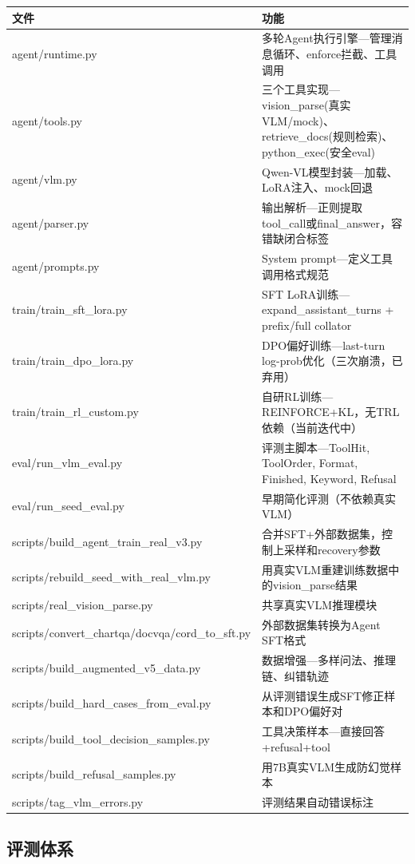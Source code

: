 \documentclass[fontset=none,11pt,a4paper]{ctexart}
\begin{document}
\begin{longtable}{lp{9cm}}
\toprule
文件 & 功能 \\
\midrule
agent/runtime.py & 多轮Agent执行引擎---管理消息循环、enforce拦截、工具调用 \\
agent/tools.py & 三个工具实现---vision\_parse(真实VLM/mock)、retrieve\_docs(规则检索)、python\_exec(安全eval) \\
agent/vlm.py & Qwen-VL模型封装---加载、LoRA注入、mock回退 \\
agent/parser.py & 输出解析---正则提取tool\_call或final\_answer，容错缺闭合标签 \\
agent/prompts.py & System prompt---定义工具调用格式规范 \\
\midrule
train/train\_sft\_lora.py & SFT LoRA训练---expand\_assistant\_turns + prefix/full collator \\
train/train\_dpo\_lora.py & DPO偏好训练---last-turn log-prob优化（三次崩溃，已弃用） \\
train/train\_rl\_custom.py & 自研RL训练---REINFORCE+KL，无TRL依赖（当前迭代中） \\
\midrule
eval/run\_vlm\_eval.py & 评测主脚本---ToolHit, ToolOrder, Format, Finished, Keyword, Refusal \\
eval/run\_seed\_eval.py & 早期简化评测（不依赖真实VLM） \\
\midrule
scripts/build\_agent\_train\_real\_v3.py & 合并SFT+外部数据集，控制上采样和recovery参数 \\
scripts/rebuild\_seed\_with\_real\_vlm.py & 用真实VLM重建训练数据中的vision\_parse结果 \\
scripts/real\_vision\_parse.py & 共享真实VLM推理模块 \\
scripts/convert\_chartqa/docvqa/cord\_to\_sft.py & 外部数据集转换为Agent SFT格式 \\
scripts/build\_augmented\_v5\_data.py & 数据增强---多样问法、推理链、纠错轨迹 \\
scripts/build\_hard\_cases\_from\_eval.py & 从评测错误生成SFT修正样本和DPO偏好对 \\
scripts/build\_tool\_decision\_samples.py & 工具决策样本---直接回答+refusal+tool \\
scripts/build\_refusal\_samples.py & 用7B真实VLM生成防幻觉样本 \\
scripts/tag\_vlm\_errors.py & 评测结果自动错误标注 \\
\bottomrule
\end{longtable}

\subsection{评测体系}
\end{document}
